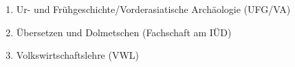 \begin{enumerate}[noitemsep]
        \item Ur- und Frühgeschichte/Vorderasiatische Archäologie (UFG/VA)                                                                                                                                                \\
        \item Übersetzen und Dolmetschen (Fachschaft am IÜD)                                                                                                                                                              \\
        \item Volkswirtschaftslehre (VWL)
    \end{enumerate}
   